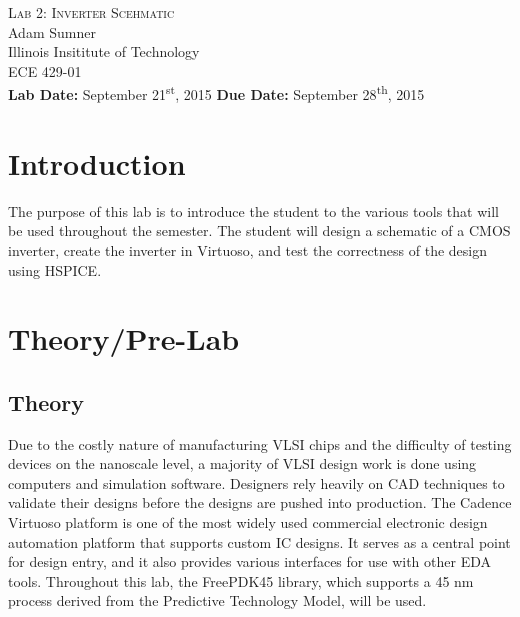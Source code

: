 \documentclass[12pt]{article}
\begin{document}
\begin{titlepage}
	\begin{center}
		
		
		\vfill
		
		\textsc{\LARGE Lab 2: Inverter Scehmatic}\\[1.5cm]
		
		\Large Adam Sumner\\[0.5cm]
		
		\Large Illinois Insititute of Technology\\[0.5cm]
		
		\Large ECE 429-01\\[0.5cm]	
		
		\noindent
		\vfill
		\large \textbf{Lab Date:} September 21\textsuperscript{st}, 2015\hfill
		\large \textbf{Due Date:} September 28\textsuperscript{th}, 2015
		
		
	\end{center}
\end{titlepage}

\section{Introduction}
The purpose of this lab is to introduce the student to the various tools that will be used throughout the semester. The student will design a schematic of a CMOS inverter, create the inverter in Virtuoso, and test the correctness of the design using HSPICE.

\section{Theory/Pre-Lab}
\subsection{Theory}
Due to the costly nature of manufacturing VLSI chips and the difficulty of testing devices on the nanoscale level, a majority of VLSI design work is done using computers and simulation  software. Designers rely heavily on CAD techniques to validate their designs before the designs are pushed into production. The Cadence Virtuoso platform is one of the most widely used commercial electronic design automation platform that supports custom IC designs. It serves as a central point for design entry, and it also provides various interfaces for use with other EDA tools. Throughout this lab, the FreePDK45 library, which supports a 45 nm process derived from the Predictive Technology Model, will be used.
\end{document}
